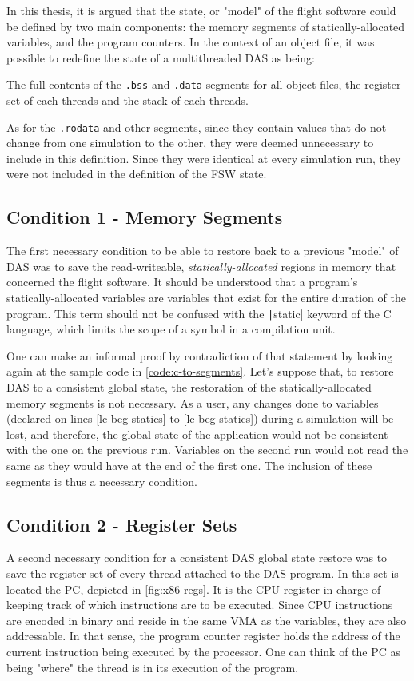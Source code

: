 {In this thesis, it is argued that the state, or "model" of the flight software could be defined by two main components: the memory segments of statically-allocated variables, and the program counters. In the context of an object file, it was possible to redefine the state of a multithreaded DAS as being:
\begin{shadedquotation}
The full contents of the \texttt{.bss} and \texttt{.data} segments for all object files, the register set of each threads and the stack of each threads. 
\end{shadedquotation}

As for the \texttt{.rodata} and other segments, since they contain values that do not change from one simulation to the other, they were deemed unnecessary to include in this definition. Since they were identical at every simulation run, they were not included in the definition of the FSW state.

\subsection*{Condition 1 - Memory Segments}
The first necessary condition to be able to restore back to a previous "model" of DAS was to save the read-writeable, \textit{statically-allocated} regions in memory that concerned the flight software. It should be understood that a program's statically-allocated variables are variables that exist for the entire duration of the program. This term should not be confused with the \texttt|static| keyword of the C language, which limits the scope of a symbol in a compilation unit.

One can make an informal proof by contradiction of that statement by looking again at the sample code in \autoref{code:c-to-segments}. Let's suppose that, to restore DAS to a consistent global state, the restoration of the statically-allocated memory segments is not necessary. As a user, any changes done to variables (declared on lines \ref{lc-beg-statics} to \ref{lc-beg-statics}) during a simulation will be lost, and therefore, the global state of the application would not be consistent with the one on the previous run. Variables on the second run would not read the same as they would have at the end of the first one. The inclusion of these segments is thus a necessary condition.

\subsection*{Condition 2 - Register Sets}
A second necessary condition for a consistent DAS global state restore was to save the register set of every thread attached to the DAS program. In this set is located the \gls{PC}, depicted in \autoref{fig:x86-regs}. It is the CPU register in charge of keeping track of which instructions are to be executed. Since CPU instructions are encoded in binary and reside in the same \gls{VMA} as the variables, they are also addressable. In that sense, the program counter register holds the address of the current instruction being executed by the processor. One can think of the PC as being "where" the thread is in its execution of the program.

}
